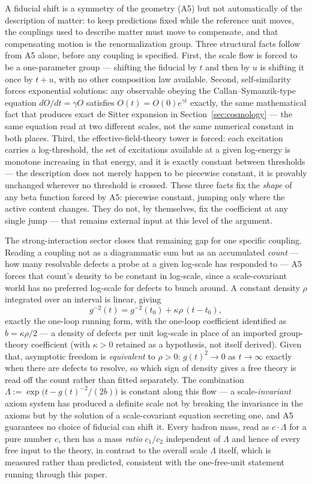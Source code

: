\documentclass[aps,prd,twocolumn,superscriptaddress,nofootinbib]{revtex4-2}
\begin{document}
A fiducial shift is a symmetry of the geometry (A5) but not automatically
of the description of matter: to keep predictions fixed while the
reference unit moves, the couplings used to describe matter must move to
compensate, and that compensating motion is the renormalization group.
Three structural facts follow from A5 alone, before any coupling is
specified. First, the scale flow is forced to be a one-parameter group —
shifting the fiducial by $t$ and then by $u$ is shifting it once by
$t+u$, with no other composition law available. Second, self-similarity
forces exponential solutions: any observable obeying the
Callan–Symanzik-type equation $dO/dt=\gamma O$ satisfies
$O(t)=O(0)e^{\gamma t}$ exactly, the same mathematical fact that produces
exact de Sitter expansion in Section~\ref{sec:cosmology} — the same
equation read at two different scales, not the same numerical constant
in both places. Third, the effective-field-theory tower is forced: each
excitation carries a log-threshold, the set of excitations available at
a given log-energy is monotone increasing in that energy, and it is
exactly constant between thresholds — the description does not merely
happen to be piecewise constant, it is provably unchanged wherever no
threshold is crossed. These three facts fix the \emph{shape} of any beta
function forced by A5: piecewise constant, jumping only where the
active content changes. They do not, by themselves, fix the coefficient
at any single jump — that remains external input at this level of the
argument.

The strong-interaction sector closes that remaining gap for one specific
coupling. Reading a coupling not as a diagrammatic sum but as an
accumulated \emph{count} — how many resolvable defects a probe at a
given log-scale has responded to — A5 forces that count's density to be
constant in log-scale, since a scale-covariant world has no preferred
log-scale for defects to bunch around. A constant density $\rho$
integrated over an interval is linear, giving
\begin{equation}
g^{-2}(t) = g^{-2}(t_0) + \kappa\rho\,(t-t_0),
\end{equation}
exactly the one-loop running form, with the one-loop coefficient
identified as $b=\kappa\rho/2$ — a density of defects per unit log-scale
in place of an imported group-theory coefficient (with $\kappa>0$
retained as a hypothesis, not itself derived). Given that, asymptotic
freedom is \emph{equivalent} to $\rho>0$: $g(t)^2\to0$ as $t\to\infty$
exactly when there are defects to resolve, so which sign of density
gives a free theory is read off the count rather than fitted
separately. The combination
$\Lambda := \exp\bigl(t-g(t)^{-2}/(2b)\bigr)$ is constant along this
flow — a scale-\emph{invariant} axiom system has produced a definite
scale not by breaking the invariance in the axioms but by the solution
of a scale-covariant equation secreting one, and A5 guarantees no choice
of fiducial can shift it. Every hadron mass, read as $c\cdot\Lambda$ for
a pure number $c$, then has a mass \emph{ratio} $c_1/c_2$ independent of
$\Lambda$ and hence of every free input to the theory, in contrast to
the overall scale $\Lambda$ itself, which is measured rather than
predicted, consistent with the one-free-unit statement running through
this paper.
\end{document}

